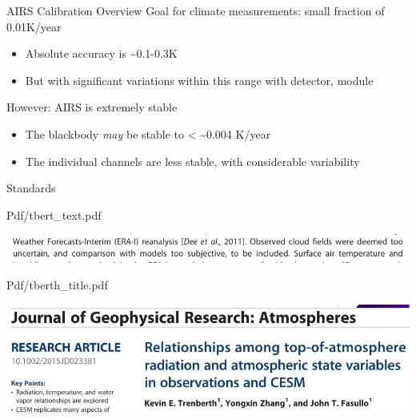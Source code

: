 \documentclass[presentation]{beamer}
\begin{document}
\begin{frame}[label={sec:orgea431f4}]{AIRS Calibration Overview}
Goal for climate measurements: small fraction of 0.01K/year

\begin{itemize}
\item Absolute accuracy is \textasciitilde{}0.1-0.3K
\item But with significant variations within this range with detector, module
\end{itemize}


However:  AIRS is extremely stable
\begin{itemize}
\item The blackbody \emph{may} be stable to < \textasciitilde{}0.004 K/year
\item The individual channels are less stable, with considerable variability
\end{itemize}
\end{frame}



\begin{frame}[label={sec:org2c31b68}]{Standards}
\end{frame}

\begin{frame}[label={sec:orgc61001c}]{Pdf/tbert\_text.pdf}
\begin{center}
\includegraphics[width=0.7\linewidth]{./Figs/Pdf/tbert_text.pdf}
\end{center}
\end{frame}

\begin{frame}[label={sec:orgb9cda81}]{Pdf/tberth\_title.pdf}
\begin{center}
\includegraphics[width=0.7\linewidth]{./Figs/Pdf/tberth_title.pdf}
\end{center}
\end{frame}
\end{document}
